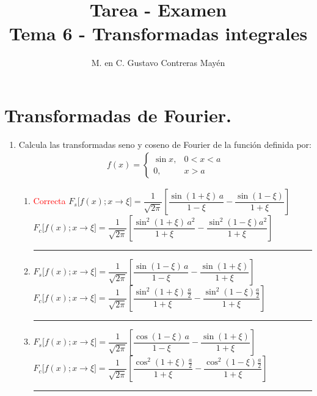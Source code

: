 
\title{Tarea - Examen \\ \large {Tema 6 - Transformadas integrales} \vspace{-3ex}}
\author{M. en C. Gustavo Contreras Mayén}
\date{ }

\vspace{-4cm}
\maketitle
\fontsize{14}{14}\selectfont
\section{Transformadas de Fourier.}
\begin{enumerate}
\item Calcula las transformadas seno y coseno de Fourier de la función definida por:
\begin{align*}
f(x) = \begin{cases}
\sin x, & 0 < x < a \\
0, & x > a
\end{cases}
\end{align*}
\begin{enumerate}[label=1.\alph*)]
\setlength\itemsep{2em}
\item \textcolor{red}{Correcta} $F_{s} \big[f(x); x \to \xi \big] = \dfrac{1}{\sqrt{2 \pi}} \left[ \dfrac{\sin (1 + \xi) \, a}{1 - \xi} - \dfrac{\sin(1 - \xi)}{1 + \xi} \right]$
\mbox{}\\$F_{c} \big[f(x); x \to \xi \big] = \dfrac{1}{\sqrt{2 \pi}} \left[ \dfrac{\sin^{2} (1 + \xi) \, a^{2}}{1 + \xi} - \dfrac{\sin^{2}(1 - \xi) a^{2}}{1 + \xi} \right]$ \hrule
\item $F_{s} \big[f(x); x \to \xi \big] = \dfrac{1}{\sqrt{2 \pi}} \left[ \dfrac{\sin (1 - \xi) \, a}{1 - \xi} - \dfrac{\sin(1 + \xi)}{1 + \xi} \right]$
\mbox{}\\$F_{c} \big[f(x); x \to \xi \big] = \dfrac{1}{\sqrt{2 \pi}} \left[ \dfrac{\sin^{2} (1 + \xi) \, \frac{a}{2}}{1 + \xi} - \dfrac{\sin^{2}(1 - \xi)\frac{a}{2}}{1 + \xi} \right]$ \hrule
\item $F_{s} \big[f(x); x \to \xi \big] = \dfrac{1}{\sqrt{2 \pi}} \left[ \dfrac{\cos (1 - \xi) \, a}{1 - \xi} - \dfrac{\sin(1 + \xi)}{1 + \xi} \right]$
\mbox{}\\$F_{c} \big[f(x); x \to \xi \big] = \dfrac{1}{\sqrt{2 \pi}} \left[ \dfrac{\cos^{2} (1 + \xi) \, \frac{a}{2}}{1 + \xi} - \dfrac{\cos^{2}(1 - \xi)\frac{a}{2}}{1 + \xi} \right]$ \hrule

\end{enumerate}
\end{enumerate}
